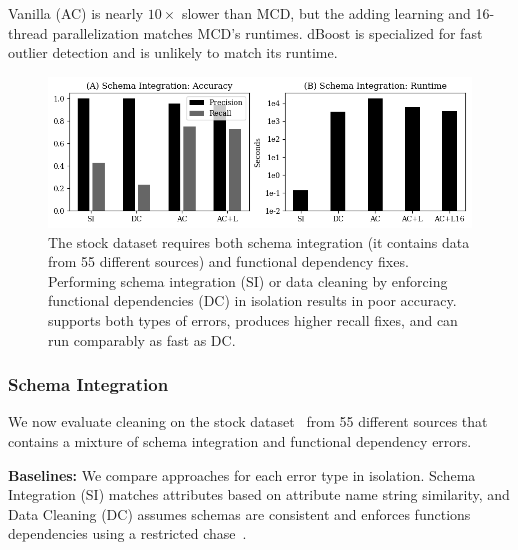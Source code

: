 Vanilla \sys (AC) is nearly $10\times$ slower than MCD, but the adding learning and 16-thread parallelization  matches MCD's runtimes.  dBoost is specialized for fast outlier detection and \sys is unlikely to match its runtime.  


\begin{figure}
    \centering
    \includegraphics[width=\columnwidth]{exp/exp3.png}
    \caption{The stock dataset requires both schema integration (it contains data from 55 different sources) and functional dependency fixes.  Performing schema integration (SI) or data cleaning by enforcing functional dependencies (DC) in isolation results in poor accuracy.  \sys supports both types of errors, produces higher recall fixes, and can run comparably as fast as DC.  \label{exp3a}}
\end{figure}

\subsubsection{Schema Integration}
We now evaluate cleaning on the stock dataset~\cite{data-flights} from 55 different sources that contains a mixture of schema integration and functional dependency errors.

\vspace{0.5em}\noindent\textbf{Baselines: } We compare approaches for each error type in isolation.  Schema Integration  (SI) matches attributes based on attribute name string similarity, and Data Cleaning (DC) assumes schemas are consistent and enforces functions dependencies using a restricted chase~\cite{benedikt2017benchmarking}.


